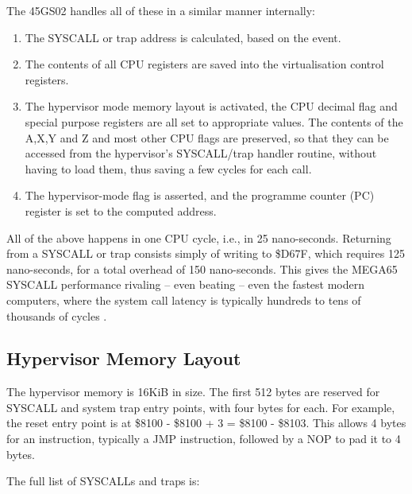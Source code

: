 The 45GS02 handles all of these in a similar manner internally:

\begin{enumerate}
\item The SYSCALL or trap address is calculated, based on the event.
\item The contents of all CPU registers are saved into the virtualisation control registers.
\item The hypervisor mode memory layout is activated, the CPU decimal flag and special purpose registers are all set to appropriate values.  The contents of the A,X,Y and Z and most other CPU flags are preserved, so that they can be accessed from the hypervisor's SYSCALL/trap handler routine, without having to load them, thus saving a few cycles for each call.
\item The hypervisor-mode flag is asserted, and the programme counter (PC) register is set to the computed address.
\end{enumerate}

All of the above happens in one CPU cycle, i.e., in 25 nano-seconds.
Returning from a SYSCALL or trap consists simply of writing to \$D67F, which
requires 125 nano-seconds, for a total overhead of 150 nano-seconds. 
This gives the MEGA65 SYSCALL performance rivaling -- even beating -- even the fastest modern computers, where the system call latency is typically hundreds to tens of thousands of cycles \cite{soares2010flexsc}.

\subsection{Hypervisor Memory Layout}

The hypervisor memory is 16KiB in size.  The first 512 bytes are reserved for SYSCALL and system trap entry
points, with four bytes for each.  For example, the reset entry point is at \$8100 - \$8100 + 3 = \$8100 - \$8103.
This allows 4 bytes for an instruction, typically a JMP instruction, followed by a NOP to pad it to 4 bytes.

The full list of SYSCALLs and traps is:

